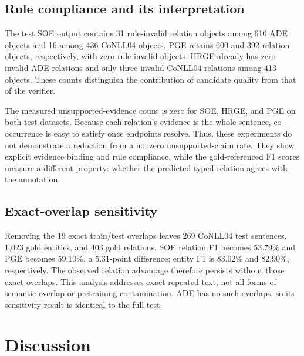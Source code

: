 \documentclass[preprint,12pt]{elsarticle}
\begin{document}
\begin{table}[htbp]
\centering\scriptsize\setlength{\tabcolsep}{3pt}
\caption{Development-set ablation under the common strict-span evaluator
(micro \%, seed 42). These rows characterize the frozen architecture and are
not additional promoted test systems.}
\label{tab:ablation}

\end{table}

\subsection{Rule compliance and its interpretation}
The test SOE output contains 31 rule-invalid relation objects among 610 ADE
objects and 16 among 436 CoNLL04 objects. PGE retains 600 and 392 relation
objects, respectively, with zero rule-invalid objects. HRGE already has zero
invalid ADE relations and only three invalid CoNLL04 relations among 413
objects. These counts distinguish the contribution of candidate quality from
that of the verifier.

The measured unsupported-evidence count is zero for SOE, HRGE, and PGE on both
test datasets. Because each relation's evidence is the whole sentence,
co-occurrence is easy to satisfy once endpoints resolve. Thus, these
experiments do not demonstrate a reduction from a nonzero unsupported-claim
rate. They show explicit evidence binding and rule compliance, while the
gold-referenced F1 scores measure a different property: whether the predicted
typed relation agrees with the annotation.

\subsection{Exact-overlap sensitivity}
Removing the 19 exact train/test overlaps leaves 269 CoNLL04 test sentences,
1,023 gold entities, and 403 gold relations. SOE relation F1 becomes 53.79\%
and PGE becomes 59.10\%, a 5.31-point difference; entity F1 is 83.02\% and
82.90\%, respectively. The observed relation advantage therefore persists
without those exact overlaps. This analysis addresses exact repeated text,
not all forms of semantic overlap or pretraining contamination. ADE has no
such overlaps, so its sensitivity result is identical to the full test.

\section{Discussion}
\label{sec:discussion}
\end{document}
